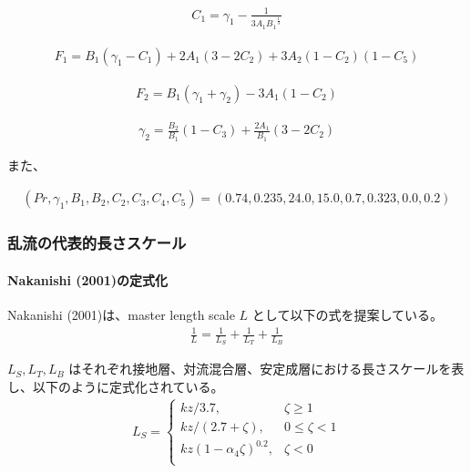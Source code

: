 \begin{eqnarray}C_1=\gamma_1-\frac{1}{3A_1{B_1}^{\frac{1}{3}}}\end{eqnarray}

\begin{eqnarray}F_1=B_1(\gamma_1-C_1)+2A_1(3-2C_2)+3A_2(1-C_2)(1-C_5)\end{eqnarray}

\begin{eqnarray}F_2=B_1(\gamma_1+\gamma_2)-3A_1(1-C_2)\end{eqnarray}

\begin{eqnarray}\gamma_2=\frac{B_2}{B_1}\left(1-C_3\right)+\frac{2A_1}{B_1}\left(3-2C_2\right)\end{eqnarray}

また、

\begin{eqnarray}
(Pr,\gamma_1,B_1,B_2,C_2,C_3,C_4,C_5)=(0.74,0.235,24.0,15.0,0.7,0.323,0.0,0.2)
\end{eqnarray}

\hypertarget{ux4e71ux6d41ux306eux4ee3ux8868ux7684ux9577ux3055ux30b9ux30b1ux30fcux30eb}{%
\subsubsection{乱流の代表的長さスケール}\label{ux4e71ux6d41ux306eux4ee3ux8868ux7684ux9577ux3055ux30b9ux30b1ux30fcux30eb}}

\hypertarget{nakanishi-2001ux306eux5b9aux5f0fux5316}{%
\paragraph{Nakanishi (2001)の定式化}\label{nakanishi-2001ux306eux5b9aux5f0fux5316}}

Nakanishi (2001)は、master length scale \(L\) として以下の式を提案している。 \begin{eqnarray}\frac{1}{L}=\frac{1}{L_S}+\frac{1}{L_T}+\frac{1}{L_B} \label{1} \end{eqnarray}

\(L_S,L_T,L_B\) はそれぞれ接地層、対流混合層、安定成層における長さスケールを表し、以下のように定式化されている。 \begin{eqnarray}
L_S=\left\{
    \begin{array}{lr}
      kz/3.7, &\zeta\ge 1\\
      kz/(2.7+\zeta), &0\le\zeta< 1\\
      kz(1-\alpha_4\zeta)^{0.2}, &\zeta< 0\\
    \end{array}
  \right.
\end{eqnarray}

